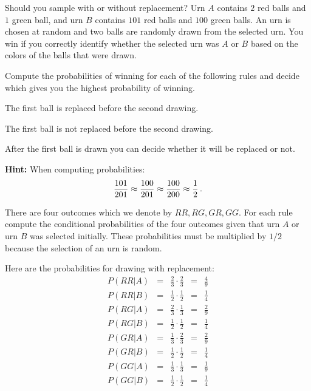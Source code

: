 

\begin{prob}{Should you sample with or without replacement?}
Urn $A$ contains $2$ red balls and $1$ green ball, and urn $B$ contains $101$ red balls and $100$ green balls. An urn is chosen at random and two balls are randomly drawn from the selected urn. You win if you correctly identify whether the selected urn was $A$ or $B$ based on the colors of the balls that were drawn.

Compute the probabilities of winning for each of the following rules and decide which gives you the highest probability of winning.

 The first ball is replaced before the second drawing.

 The first ball is not replaced before the second drawing.

 After the first ball is drawn you can decide whether it will be replaced or not.

\textbf{Hint:} When computing probabilities:
\[
\displaystyle\frac{101}{201}\approx \displaystyle\frac{100}{201} \approx \displaystyle\frac{100}{200} \approx \displaystyle\frac{1}{2}\,.
\]
\end{prob}
\vspace{-5ex}

\solution{}

There are four outcomes which we denote by $RR, RG, GR, GG$. For each rule compute the conditional probabilities of the four outcomes given that urn $A$ or urn $B$ was selected initially. These probabilities must be multiplied by $1/2$ because the selection of an urn is random.

 Here are the probabilities for drawing with replacement:
\[
\renewcommand*{\arraystretch}{1.5}
\begin{array}{lcccc}
P(RR|A) &=& \frac{2}{3} \cdot \frac{2}{3} &=& \frac{4}{9}\\
P(RR|B) &=& \frac{1}{2} \cdot \frac{1}{2} &=& \frac{1}{4}\\
\hline
P(RG|A) &=& \frac{2}{3} \cdot \frac{1}{3} &=& \frac{2}{9}\\
P(RG|B) &=& \frac{1}{2} \cdot \frac{1}{2} &=& \frac{1}{4}\\
\hline
P(GR|A) &=& \frac{1}{3} \cdot \frac{2}{3} &=& \frac{2}{9}\\
P(GR|B) &=& \frac{1}{2} \cdot \frac{1}{2} &=& \frac{1}{4}\\
\hline
P(GG|A) &=& \frac{1}{3} \cdot \frac{1}{3} &=& \frac{1}{9}\\
P(GG|B) &=& \frac{1}{2} \cdot \frac{1}{2} &=& \frac{1}{4}\end{array}
\]

